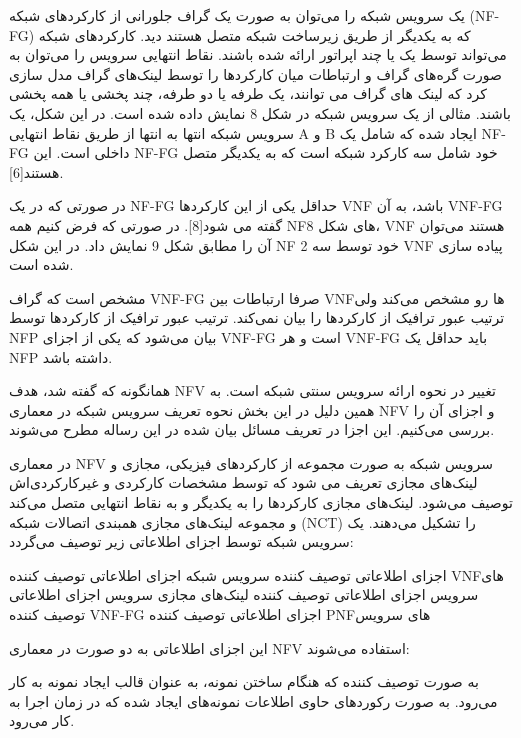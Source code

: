 \documentclass{book}
\begin{document}

یک سرویس شبکه را می‌توان به صورت یک گراف جلورانی از کارکردهای شبکه (NF-FG) که به یکدیگر از طریق زیرساخت شبکه متصل هستند دید.
کارکردهای شبکه می‌تواند توسط یک یا چند اپراتور ارائه شده باشند. نقاط انتهایی سرویس را می‌توان به صورت گره‌های گراف و ارتباطات
میان کارکردها را توسط لینک‌های گراف مدل سازی کرد که لینک های گراف می توانند، یک طرفه یا دو طرفه، چند پخشی یا همه پخشی باشند. مثالی از یک سرویس شبکه در شکل 8 نمایش داده شده است. در این شکل، یک سرویس شبکه انتها به انتها از طریق نقاط انتهایی A و B ایجاد شده که شامل یک NF-FG داخلی است. این NF-FG خود شامل سه کارکرد شبکه است که به یکدیگر متصل هستند[6].

در صورتی که در یک NF-FG حداقل یکی از این کارکردها VNF باشد، به آن VNF-FG گفته می شود[8].
در صورتی که فرض کنیم همه NFهای شکل 8، VNF هستند می‌توان آن را مطابق شکل 9 نمایش داد. در این شکل NF 2 خود توسط سه VNF پیاده سازی شده است.

مشخص است که گراف VNF-FG صرفا ارتباطات بین VNFها رو مشخص می‌کند ولی ترتیب عبور ترافیک از کارکردها را بیان نمی‌کند.
ترتیب عبور ترافیک از کارکردها توسط NFP بیان می‌شود که یکی از اجزای VNF-FG است و هر VNF-FG باید حداقل یک NFP داشته باشد.

همانگونه که گفته شد، هدف NFV تغییر در نحوه ارائه سرویس سنتی شبکه است.
به همین دلیل در این بخش نحوه تعریف سرویس شبکه در معماری NFV و اجزای آن را بررسی می‌کنیم. این اجزا در تعریف مسائل بیان شده در این رساله مطرح می‌شوند.


در معماری NFV سرویس شبکه به صورت مجموعه از کارکردهای فیزیکی، مجازی و لینک‌های مجازی تعریف می شود که توسط مشخصات کارکردی و غیرکارکردی‌اش توصیف می‌شود.
لینک‌های مجازی کارکردها را به یکدیگر و به نقاط انتهایی متصل می‌کند و مجموعه لینک‌های مجازی همبندی اتصالات شبکه
(NCT) را تشکیل می‌دهند. یک سرویس شبکه توسط اجزای اطلاعاتی زیر توصیف می‌گردد:

 اجزای اطلاعاتی توصیف کننده سرویس شبکه
 اجزای اطلاعاتی توصیف کننده VNFهای سرویس
 اجزای اطلاعاتی توصیف کننده لینک‌های مجازی سرویس
 اجزای اطلاعاتی توصیف کننده VNF-FG
 اجزای اطلاعاتی توصیف کننده PNFهای سرویس

این اجزای اطلاعاتی به دو صورت در معماری NFV استفاده می‌شوند:

 به صورت توصیف کننده که هنگام ساختن نمونه، به عنوان قالب ایجاد نمونه به کار می‌رود.
 به صورت رکوردهای حاوی اطلاعات نمونه‌های ایجاد شده که در زمان اجرا به کار می‌رود.
\end{document}
